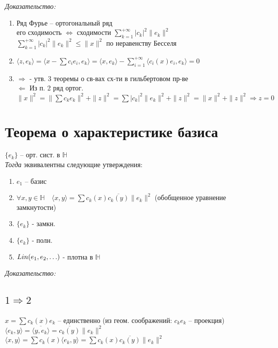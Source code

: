 \documentclass[paper=a4, fontsize=17pt]{article}
\begin{document}
\emph{Доказательство:}
\begin{enumerate}
	\item 
	Ряд Фурье -- ортогональный ряд\\
	его сходимость $\Leftrightarrow$ сходимости $\sum\limits_{k=1}^{+\infty} \vert c_k \vert^2 \|e_k\|^2$\\
	$\sum\limits_{k=1}^{+\infty} \vert c_k \vert^2 \|e_k\|^2 \le \|x\|^2$ по неравенству Бесселя
	\item 
	$\langle z, e_k \rangle = \langle x - \sum c_i e_i, e_k \rangle = \langle x, e_k \rangle - \sum\limits_{i = 1}^{+\infty}  \langle c_i(x) e_i ,e_k \rangle = 0$	
	\item 
	$\Rightarrow$ - утв. 3 теоремы о св-вах сх-ти в гильбертовом пр-ве\\
	$\Leftarrow$
		Из п. 2 ряд ортог.\\ 
		$\|x\|^2=\|\sum c_k e_k\|^2 + \|z\|^2 = \sum \vert c_k \vert^2 \|e_k\|^2 + \|z\|^2 = \|x\|^2 + \|z\|^2 \Rightarrow z = 0$
\end{enumerate}

\section{Теорема о характеристике базиса}

$\{e_k\}$ -- орт. сист. в $\mathds{H}$\\

\emph{Тогда} эквивалентны следующие утверждения:
\begin{enumerate}
	\item $e_1$ -- базис
	\item $\forall x, y \in \mathds{H} \quad \langle x, y \rangle = \sum c_k(x)\overline{c_k(y)}\|e_k\|^2$ (обобщенное уравнение замкнутости)
	\item $\{e_k\}$ - замкн.
	\item $\{e_k\}$ - полн.
	\item $Lin(e_1, e_2, \mathellipsis)$ - плотна в $\mathds{H}$ 
\end{enumerate}

\emph{Доказательство:}

\subsection{\texorpdfstring{$1 \Rightarrow 2$}{TEXT}}
$x=\sum c_k(x) e_k$ -- единственно (из геом. соображений: $c_k e_k$ -- проекция)\\
$\langle e_k, y \rangle = \overline{\langle y, e_k \rangle} = \overline{c_k(y)}\|e_k\|^2$\\
$\langle x, y \rangle = \sum c_k(x) \langle e_k, y \rangle = \sum c_k(x)\overline{c_k(y)}\|e_k\|^2$
\end{document}
